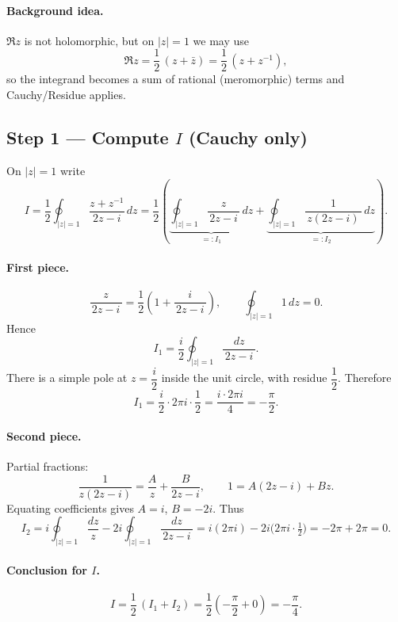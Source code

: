 \documentclass[11pt]{article}
\begin{document}
\paragraph{Background idea.}
$\Re z$ is not holomorphic, but on $|z|=1$ we may use
\[
\Re z=\frac12\,(z+\bar z)=\frac12\,(z+z^{-1}),
\]
so the integrand becomes a sum of rational (meromorphic) terms and Cauchy/Residue applies.

\subsection*{Step 1 — Compute $I$ (Cauchy only)}
On $|z|=1$ write
\[
I=\frac12\oint_{|z|=1}\frac{z+z^{-1}}{\,2z-i\,}\,dz
=\frac12\left(\underbrace{\oint_{|z|=1}\frac{z}{\,2z-i\,}\,dz}_{=:I_1}
+\underbrace{\oint_{|z|=1}\frac{1}{\,z(2z-i)\,}\,dz}_{=:I_2}\right).
\]

\paragraph{First piece.}
\[
\frac{z}{\,2z-i\,}=\frac12\left(1+\frac{i}{\,2z-i\,}\right),
\qquad
\oint_{|z|=1} 1\,dz=0.
\]
Hence
\[
I_1=\frac{i}{2}\oint_{|z|=1}\frac{dz}{\,2z-i\,}.
\]
There is a simple pole at $z=\dfrac{i}{2}$ inside the unit circle, with residue $\dfrac{1}{2}$.
Therefore
\[
I_1=\frac{i}{2}\cdot 2\pi i\cdot \frac{1}{2}=\frac{i\cdot 2\pi i}{4}=-\frac{\pi}{2}.
\]

\paragraph{Second piece.}
Partial fractions:
\[
\frac{1}{z(2z-i)}=\frac{A}{z}+\frac{B}{2z-i},
\qquad
1=A(2z-i)+Bz.
\]
Equating coefficients gives $A=i$, $B=-2i$. Thus
\[
I_2
=i\oint_{|z|=1}\frac{dz}{z}
-2i\oint_{|z|=1}\frac{dz}{\,2z-i\,}
=
i(2\pi i)-2i\bigl(2\pi i\cdot \tfrac12\bigr)
=
-2\pi+2\pi=0.
\]

\paragraph{Conclusion for $I$.}
\[
I=\frac12\,(I_1+I_2)=\frac12\left(-\frac{\pi}{2}+0\right)=\boxed{-\frac{\pi}{4}}.
\]

\end{document}
